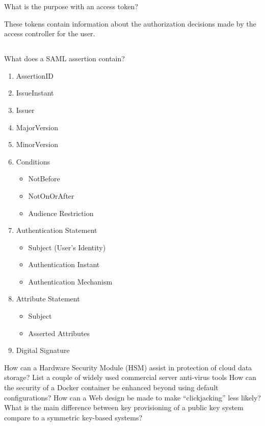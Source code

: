 \begin{questions}
\question{} What is the purpose with an access token?
  \begin{solution}
    These tokens contain information about the authorization decisions made by the access controller for the user.
  \end{solution}

  \begin{parts}
  \part{} What does a SAML assertion contain?
    \begin{solution}
      \begin{enumerate}[noitemsep]
      \item AssertionID
      \item IssueInstant
      \item Issuer
      \item MajorVersion
      \item MinorVersion
      \item Conditions
        \begin{itemize}[noitemsep]
        \item NotBefore
        \item NotOnOrAfter
        \item Audience Restriction
        \end{itemize}
      \item Authentication Statement
        \begin{itemize}[noitemsep]
        \item Subject (User's Identity)
        \item Authentication Instant
        \item Authentication Mechanism
        \end{itemize}
      \item Attribute Statement
        \begin{itemize}[noitemsep]
        \item Subject
        \item Asserted Attributes
        \end{itemize}
      \item Digital Signature
      \end{enumerate}
    \end{solution}
  \end{parts}

\question{} How can a Hardware Security Module (HSM) assist in protection of cloud data storage?
\question{} List a couple of widely used commercial server anti-virus tools
\question{} How can the security of a Docker container be enhanced beyond using default configurations?
\question{} How can a Web design be made to make ``clickjacking'' less likely?
\question{} What is the main difference between key provisioning of a public key system compare to a symmetric key-based systems?
  \begin{parts}

\end{parts}
\end{questions}
